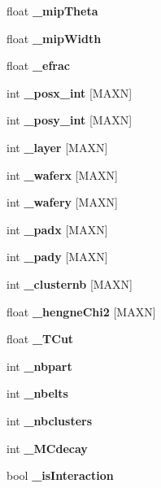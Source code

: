 \begin{CompactItemize}
\item 
float {\bf \_\-mip\-Theta}\label{classCaliceEcalHitInfo_p32}

\item 
float {\bf \_\-mip\-Width}\label{classCaliceEcalHitInfo_p33}

\item 
float {\bf \_\-efrac}\label{classCaliceEcalHitInfo_p34}

\item 
int {\bf \_\-posx\_\-int} [MAXN]\label{classCaliceEcalHitInfo_p35}

\item 
int {\bf \_\-posy\_\-int} [MAXN]\label{classCaliceEcalHitInfo_p36}

\item 
int {\bf \_\-layer} [MAXN]\label{classCaliceEcalHitInfo_p37}

\item 
int {\bf \_\-waferx} [MAXN]\label{classCaliceEcalHitInfo_p38}

\item 
int {\bf \_\-wafery} [MAXN]\label{classCaliceEcalHitInfo_p39}

\item 
int {\bf \_\-padx} [MAXN]\label{classCaliceEcalHitInfo_p40}

\item 
int {\bf \_\-pady} [MAXN]\label{classCaliceEcalHitInfo_p41}

\item 
int {\bf \_\-clusternb} [MAXN]\label{classCaliceEcalHitInfo_p42}

\item 
float {\bf \_\-hengne\-Chi2} [MAXN]\label{classCaliceEcalHitInfo_p43}

\item 
float {\bf \_\-TCut}\label{classCaliceEcalHitInfo_p44}

\item 
int {\bf \_\-nbpart}\label{classCaliceEcalHitInfo_p45}

\item 
int {\bf \_\-nbelts}\label{classCaliceEcalHitInfo_p46}

\item 
int {\bf \_\-nbclusters}\label{classCaliceEcalHitInfo_p47}

\item 
int {\bf \_\-MCdecay}\label{classCaliceEcalHitInfo_p48}

\item 
bool {\bf \_\-is\-Interaction}\label{classCaliceEcalHitInfo_p49}


\end{CompactItemize}
